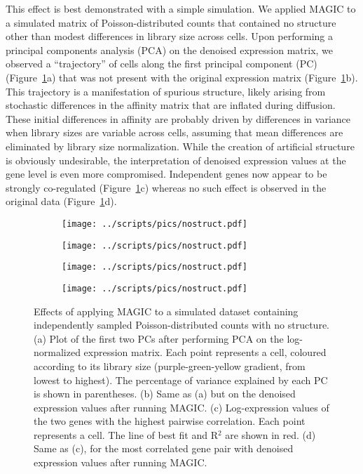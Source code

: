 \documentclass[10pt,letterpaper]{article}
\begin{document}
This effect is best demonstrated with a simple simulation.
We applied MAGIC to a simulated matrix of Poisson-distributed counts that contained no structure other than modest differences in library size across cells.
Upon performing a principal components analysis (PCA) on the denoised expression matrix, we observed a ``trajectory'' of cells along the first principal component (PC) (Figure~\ref{fig:nostructure}a) that was not present with the original expression matrix (Figure~\ref{fig:nostructure}b).
This trajectory is a manifestation of spurious structure, likely arising from stochastic differences in the affinity matrix that are inflated during diffusion.
These initial differences in affinity are probably driven by differences in variance when library sizes are variable across cells, assuming that mean differences are eliminated by library size normalization.
While the creation of artificial structure is obviously undesirable, the interpretation of denoised expression values at the gene level is even more compromised.
Independent genes now appear to be strongly co-regulated (Figure~\ref{fig:nostructure}c) whereas no such effect is observed in the original data (Figure~\ref{fig:nostructure}d).

\begin{figure}[btp]
\centering
\begin{subfigure}[b]{0.49\textwidth}
    \texttt{[image: ../scripts/pics/nostruct.pdf]}
    \caption{}
\end{subfigure}
\begin{subfigure}[b]{0.49\textwidth}
    \texttt{[image: ../scripts/pics/nostruct.pdf]}
    \caption{}
\end{subfigure}
\begin{subfigure}[b]{0.49\textwidth}
    \texttt{[image: ../scripts/pics/nostruct.pdf]}
    \caption{}
\end{subfigure}
\begin{subfigure}[b]{0.49\textwidth}
    \texttt{[image: ../scripts/pics/nostruct.pdf]}
    \caption{}
\end{subfigure}
\caption{Effects of applying MAGIC to a simulated dataset containing independently sampled Poisson-distributed counts with no structure.
(a) Plot of the first two PCs after performing PCA on the log-normalized expression matrix.
Each point represents a cell, coloured according to its library size (purple-green-yellow gradient, from lowest to highest).
The percentage of variance explained by each PC is shown in parentheses.
(b) Same as (a) but on the denoised expression values after running MAGIC.
(c) Log-expression values of the two genes with the highest pairwise correlation.
Each point represents a cell.
The line of best fit and R$^2$ are shown in red.
(d) Same as (c), for the most correlated gene pair with denoised expression values after running MAGIC.}
\label{fig:nostructure}
\end{figure}
\end{document}
